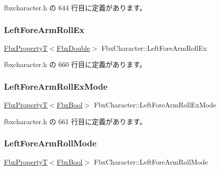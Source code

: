  fbxcharacter.\+h の 644 行目に定義があります。

\mbox{\label{class_fbx_character_a7160d66b2069f56e1620c571f3f5d06d}} 
\subsubsection{\texorpdfstring{Left\+Fore\+Arm\+Roll\+Ex}{LeftForeArmRollEx}}
{\footnotesize\ttfamily \hyperlink{class_fbx_property_t}{Fbx\+PropertyT}$<$\hyperlink{fbxtypes_8h_a171e72a1c46fc15c1a6c9c31948c1c5b}{Fbx\+Double}$>$ Fbx\+Character\+::\+Left\+Fore\+Arm\+Roll\+Ex}



 fbxcharacter.\+h の 660 行目に定義があります。

\mbox{\label{class_fbx_character_aa3b309652cc8107ccee581696ab43273}} 
\subsubsection{\texorpdfstring{Left\+Fore\+Arm\+Roll\+Ex\+Mode}{LeftForeArmRollExMode}}
{\footnotesize\ttfamily \hyperlink{class_fbx_property_t}{Fbx\+PropertyT}$<$\hyperlink{fbxtypes_8h_a92e0562b2fe33e76a242f498b362262e}{Fbx\+Bool}$>$ Fbx\+Character\+::\+Left\+Fore\+Arm\+Roll\+Ex\+Mode}



 fbxcharacter.\+h の 661 行目に定義があります。

\mbox{\label{class_fbx_character_ad39cf58d8bedc3f53f81361425d1253d}} 
\subsubsection{\texorpdfstring{Left\+Fore\+Arm\+Roll\+Mode}{LeftForeArmRollMode}}
{\footnotesize\ttfamily \hyperlink{class_fbx_property_t}{Fbx\+PropertyT}$<$\hyperlink{fbxtypes_8h_a92e0562b2fe33e76a242f498b362262e}{Fbx\+Bool}$>$ Fbx\+Character\+::\+Left\+Fore\+Arm\+Roll\+Mode}



